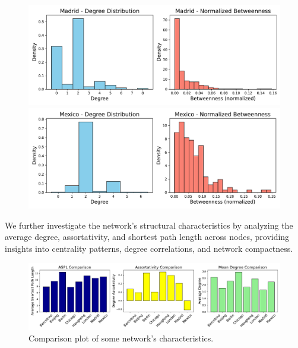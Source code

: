 \begin{figure}[h!]
    \centering
    \begin{minipage}{0.48\linewidth}
        \centering
        \includegraphics[width=\linewidth]{figures/task40_plots/deg_bet_Madrid.pdf}
        \end{minipage}%
    \hfill
    \begin{minipage}{0.48\linewidth}
        \centering
        \includegraphics[width=\linewidth]{figures/task40_plots/deg_bet_Mexico.pdf}
    \end{minipage}
\end{figure}

We further investigate the network’s structural characteristics by analyzing the average degree, assortativity, and shortest path length across nodes, providing insights into centrality patterns, degree correlations, and network compactness.

\begin{figure}[h!]
    \centering
    \includegraphics[width=0.70\linewidth]{figures/task40_plots/comparison_plot.pdf}
    \caption{Comparison plot of some network's characteristics.}
    \label{fig:comparison_plot}
\end{figure}